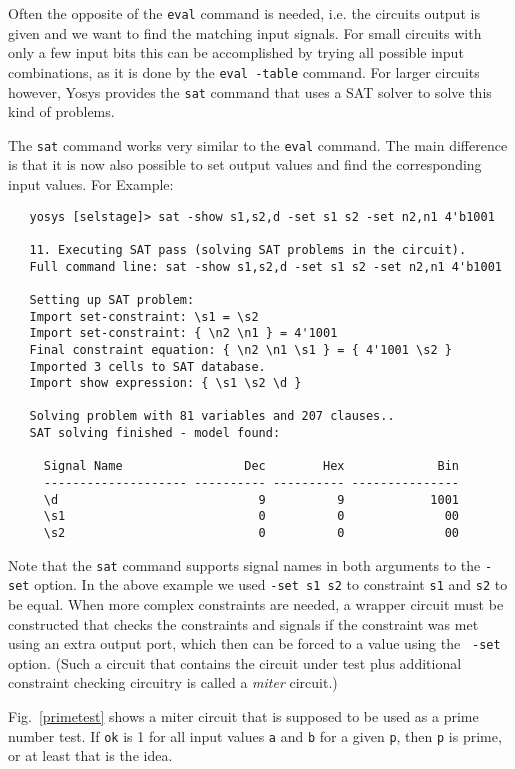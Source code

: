 \documentclass[9pt,technote,a4paper]{IEEEtran}
\begin{document}
Often the opposite of the {\tt eval} command is needed, i.e. the circuits
output is given and we want to find the matching input signals. For small
circuits with only a few input bits this can be accomplished by trying all
possible input combinations, as it is done by the {\tt eval -table} command.
For larger circuits however, Yosys provides the {\tt sat} command that uses
a SAT \cite{CircuitSAT} solver \cite{MiniSAT} to solve this kind of problems.

The {\tt sat} command works very similar to the {\tt eval} command. The main
difference is that it is now also possible to set output values and find the
corresponding input values. For Example:

{\scriptsize
\begin{verbatim}
   yosys [selstage]> sat -show s1,s2,d -set s1 s2 -set n2,n1 4'b1001
   
   11. Executing SAT pass (solving SAT problems in the circuit).
   Full command line: sat -show s1,s2,d -set s1 s2 -set n2,n1 4'b1001
   
   Setting up SAT problem:
   Import set-constraint: \s1 = \s2
   Import set-constraint: { \n2 \n1 } = 4'1001
   Final constraint equation: { \n2 \n1 \s1 } = { 4'1001 \s2 }
   Imported 3 cells to SAT database.
   Import show expression: { \s1 \s2 \d }
   
   Solving problem with 81 variables and 207 clauses..
   SAT solving finished - model found:
   
     Signal Name                 Dec        Hex             Bin
     -------------------- ---------- ---------- ---------------
     \d                            9          9            1001
     \s1                           0          0              00
     \s2                           0          0              00
\end{verbatim}
}

Note that the {\tt sat} command supports signal names in both arguments
to the {\tt -set} option. In the above example we used {\tt -set s1 s2}
to constraint {\tt s1} and {\tt s2} to be equal. When more complex
constraints are needed, a wrapper circuit must be constructed that
checks the constraints and signals if the constraint was met using an
extra output port, which then can be forced to a value using the {\tt
-set} option. (Such a circuit that contains the circuit under test
plus additional constraint checking circuitry is called a {\it miter\/}
circuit.)

Fig.~\ref{primetest} shows a miter circuit that is supposed to be used as a
prime number test. If {\tt ok} is 1 for all input values {\tt a} and {\tt b}
for a given {\tt p}, then {\tt p} is prime, or at least that is the idea.
\end{document}
